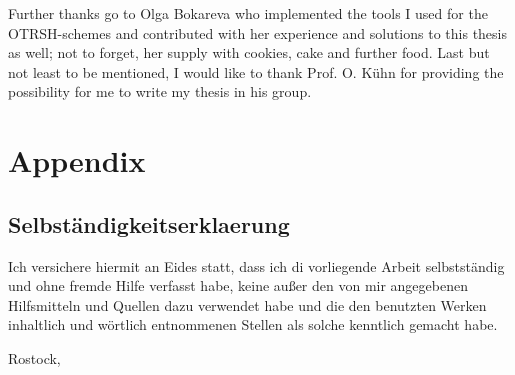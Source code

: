 \documentclass[12pt,a4paper,oneside]{book}
\begin{document}
Further thanks go to Olga Bokareva who implemented the tools I used for the OTRSH-schemes and contributed with her experience and solutions to this thesis as well; not to forget, her supply with cookies, cake and further food.
Last but not least to be mentioned, I would like to thank Prof. O. K\"uhn for providing the possibility for me to write my thesis in his group.

\small{
\printbibliography
}

\appendix

\chapter{Appendix}
%
%
%
%


%
\newpage
\section*{Selbst\"andigkeitserklaerung}
Ich versichere hiermit an Eides statt, dass ich di vorliegende Arbeit selbstst\"andig und ohne fremde Hilfe verfasst habe, keine au\ss er den von mir angegebenen Hilfsmitteln und Quellen dazu verwendet habe und die den benutzten Werken inhaltlich und w\"ortlich entnommenen Stellen als solche kenntlich gemacht habe.

\vspace{20mm}
\hfill Rostock, \date
\backmatter
\end{document}
